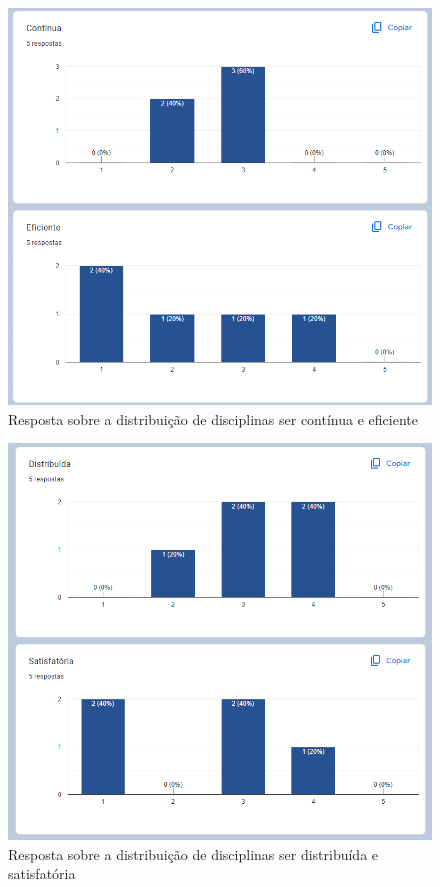         \begin{figure}[htbp]\centering
            \caption{\label{fig:5.2_Opiniao} Resposta sobre a distribuição de disciplinas ser contínua e eficiente}
            \includegraphics[scale=0.8]{files/img/forms/5.2-Opiniao-ContinuaEficiente.png}
        \end{figure} %
        \begin{figure}[htbp]\centering
            \caption{\label{fig:5.3_Opiniao} Resposta sobre a distribuição de disciplinas ser distribuída e satisfatória}
            \includegraphics[scale=0.8]{files/img/forms/5.3-Opiniao-DistribuidaSatisfatoria.png}
        \end{figure} %

